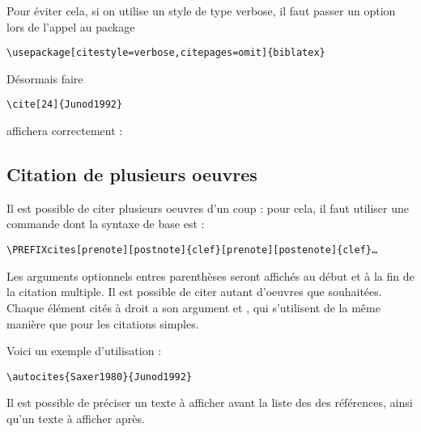 \begin{quotation}
\cite[p. 24]{Junod1992}
\end{quotation}



Pour éviter cela, si on utilise un style de type verbose, il faut passer un option lors de l'appel au package 

\begin{verbatim}
\usepackage[citestyle=verbose,citepages=omit]{biblatex}
\end{verbatim}

Désormais faire
\begin{verbatim}
\cite[24]{Junod1992}
\end{verbatim}

affichera correctement :

\begin{quotation}
\cite[24]{Junod1992}
\end{quotation}



\subsection{Citation de plusieurs oeuvres}

Il est possible de citer plusieurs oeuvres d'un coup : pour cela, il faut utiliser une commande dont la syntaxe de base est :


\begin{verbatim}
\PREFIXcites[prenote][postnote]{clef}[prenote][postenote]{clef}…
\end{verbatim}

Les arguments optionnels entres parenthèses seront affichés au début et à la fin de la citation multiple. Il est possible de citer autant d'oeuvres que souhaitées. Chaque élément cités à droit a son argument  et , qui s'utilisent de la même manière que pour les citations simples.


Voici un exemple d'utilisation : 

\begin{verbatim}
\autocites{Saxer1980}{Junod1992}
\end{verbatim}

\begin{quotation}
\cites{Saxer1980}{Junod1992}
\end{quotation}
Il est possible de préciser un texte à afficher avant la liste des des références, ainsi qu'un texte à afficher après.

